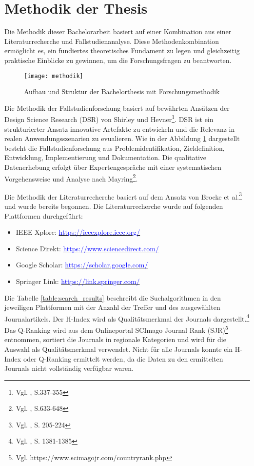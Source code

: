 
\section{Methodik der Thesis}

Die Methodik dieser Bachelorarbeit basiert auf einer Kombination aus einer Literaturrecherche und Fallstudienanalyse. Diese Methodenkombination ermöglicht es, ein fundiertes theoretisches Fundament zu legen und gleichzeitig praktische Einblicke zu gewinnen, um die Forschungsfragen zu beantworten.

\begin{figure}[H]
    \centering
    \texttt{[image: methodik]}
    \captionsetup{font=scriptsize}
    \caption{Aufbau und Struktur der Bachelorthesis mit Forschungsmethodik}
    \label{fig:methodik}
\end{figure}

Die Methodik der Fallstudienforschung basiert auf bewährten Ansätzen der Design Science Research (DSR) von Shirley und Hevner\footnote{Vgl. \cite{Shirley&Hevner2013}, S.337-355}. DSR ist ein strukturierter Ansatz innovative Artefakte zu entwickeln und die Relevanz in realen Anwendungsszenarien zu evualieren. Wie in der Abbildung \ref{fig:methodik} dargestellt besteht die Fallstudienforschung aus Problemidentifikation, Zieldefinition, Entwicklung, Implementierung und Dokumentation. Die qualitative Datenerhebung erfolgt über Expertengespräche mit einer systematischen Vorgehensweise und Analyse nach Mayring\footnote{Vgl. \cite{Mayring2019}, S.633-648}. 

Die Methodik der Literaturrecherche basiert auf dem Ansatz von Brocke et al.\footnote{Vgl. \cite{Brocke2015}, S. 205-224} und wurde bereits begonnen. Die Literaturrecherche wurde auf folgenden Plattformen durchgeführt:

\begin{itemize}
    \item IEEE Xplore: \underline{\textcolor{blue}{https://ieeexplore.ieee.org/}}
    \item Science Direkt: \underline{\textcolor{blue}{https://www.sciencedirect.com/}}
    \item Google Scholar: \underline{\textcolor{blue}{https://scholar.google.com/}}
    \item Springer Link: \underline{\textcolor{blue}{https://link.springer.com/}}
\end{itemize}

Die Tabelle \ref{table:search_results} beschreibt die Suchalgorithmen in den jeweiligen Plattformen mit der Anzahl der Treffer und des ausgewählten Journalartikels. Der H-Index wird als Qualitätsmerkmal der Journals dargestellt.\footnote{Vgl. \cite{Bornmann2007}, S. 1381-1385} Das Q-Ranking wird aus dem Onlineportal SCImago Journal Rank (SJR)\footnote{Vgl. https://www.scimagojr.com/countryrank.php } entnommen, sortiert die Journals in regionale Kategorien und wird für die Auswahl als Qualitätsmerkmal verwendet. Nicht für alle Journals konnte ein H-Index oder Q-Ranking ermittelt werden, da die Daten zu den ermittelten Journals nicht vollständig verfügbar waren.

